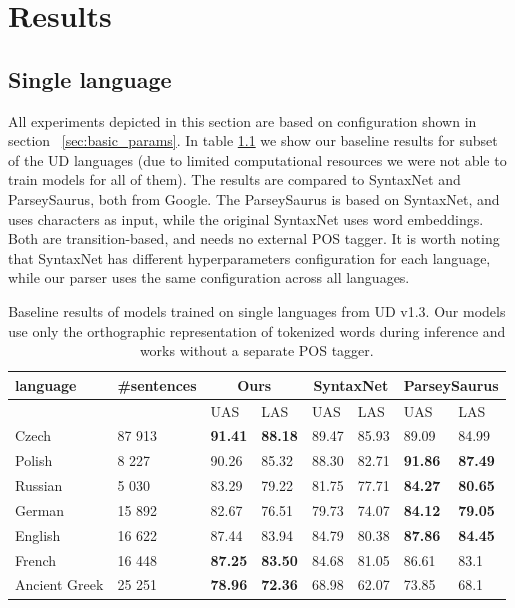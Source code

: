 \chapter{Results}

\section{Single language}
All experiments depicted in this section are based on configuration shown in section
~\ref{sec:basic_params}. In table \ref{tab:universal} we show our baseline results
for subset of the UD languages (due to limited computational resources we were
not able to train models for all of them). The results are compared to
SyntaxNet\cite{andor_globally_2016} and ParseySaurus\cite{alberti_parsey_saurus_2017},
both from Google. The ParseySaurus is based on SyntaxNet, and uses characters
as input, while the original SyntaxNet uses word embeddings. Both are transition-based,
and needs no external POS tagger.
It is worth noting that SyntaxNet has different hyperparameters configuration
for each language, while our parser uses the same configuration across all languages.

\begin{table}[!htbp]
  \centering
  \begin{tabular}{l l | l l | l l | l l}
    language & \#sentences & \multicolumn{2}{c|}{Ours} & \multicolumn{2}{c|}{SyntaxNet} & \multicolumn{2}{c}{ParseySaurus} \\ \hline
    & & UAS & LAS & UAS & LAS & UAS & LAS\\ \hline
    Czech & 87 913 & \textbf{91.41} & \textbf{88.18} & 89.47 & 85.93 & 89.09 & 84.99 \\
    Polish & 8 227 & 90.26 & 85.32 & 88.30 & 82.71 & \textbf{91.86} & \textbf{87.49}\\
    Russian & 5 030 & 83.29 & 79.22 & 81.75 & 77.71 & \textbf{84.27} & \textbf{80.65} \\
    German & 15 892 & 82.67 & 76.51 & 79.73 & 74.07 & \textbf{84.12} & \textbf{79.05}\\
    English & 16 622 & 87.44 & 83.94 & 84.79 & 80.38 & \textbf{87.86} & \textbf{84.45}\\ 
    French & 16 448 & \textbf{87.25} & \textbf{83.50} & 84.68 & 81.05 & 86.61 & 83.1\\
    Ancient Greek & 25 251 & \textbf{78.96} & \textbf{72.36} & 68.98 & 62.07 & 73.85 & 68.1
  \end{tabular}
  \caption{Baseline results of models trained on single languages from
    UD v1.3. Our models use only the orthographic representation of
    tokenized words during inference and works without a separate POS tagger.}
  \label{tab:universal}
\end{table}

